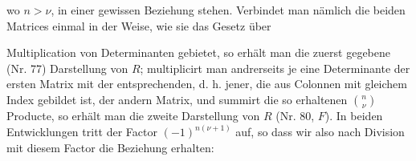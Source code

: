 \documentclass[11pt]{article}
\providecommand{\weberpage}[1]{}
\begin{document}
wo $n>\nu$, in einer gewissen Beziehung stehen. Verbindet man nämlich die beiden Matrices einmal in der Weise, wie sie das Gesetz über


\weberpage{86}

Multiplication von Determinanten gebietet, so erhält man die zuerst gegebene (Nr. 77) Darstellung von $R$; multiplicirt man andrerseits je eine Determinante der ersten Matrix mit der entsprechenden, d. h. jener, die aus Colonnen mit gleichem Index gebildet ist, der andern Matrix, und summirt die so erhaltenen $\binom{n}{\nu}$ Producte, so erhält man die zweite Darstellung von $R$ (Nr. 80, $F$). In beiden Entwicklungen tritt der Factor $(-1)^{n(\nu+1)}$ auf, so dass wir also nach Division mit diesem Factor die Beziehung erhalten:
\end{document}
